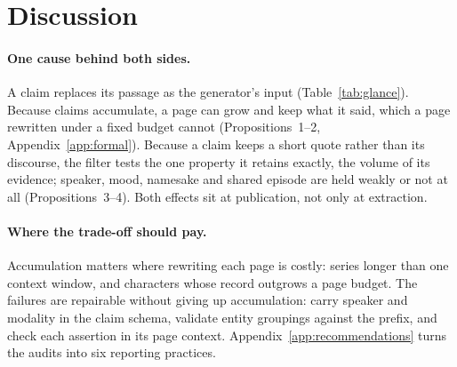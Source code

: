 \section{Discussion}
\label{sec:discussion}


\paragraph{One cause behind both sides.}
A claim replaces its passage as the generator's input (Table~\ref{tab:glance}). Because
claims accumulate, a page can grow and keep what it said, which a page rewritten under a
fixed budget cannot (Propositions~1--2, Appendix~\ref{app:formal}). Because a claim keeps a
short quote rather than its discourse, the filter tests the one property it retains exactly,
the volume of its evidence; speaker, mood, namesake and shared episode are held weakly or
not at all (Propositions~3--4). Both effects sit at publication, not only at extraction.

\paragraph{Where the trade-off should pay.}
Accumulation matters where rewriting each page is costly: series longer than one context
window, and characters whose record outgrows a page budget. The failures are repairable
without giving up accumulation: carry speaker and modality in the claim schema, validate
entity groupings against the prefix, and check each assertion in its page context.
Appendix~\ref{app:recommendations} turns the audits into six reporting practices.
